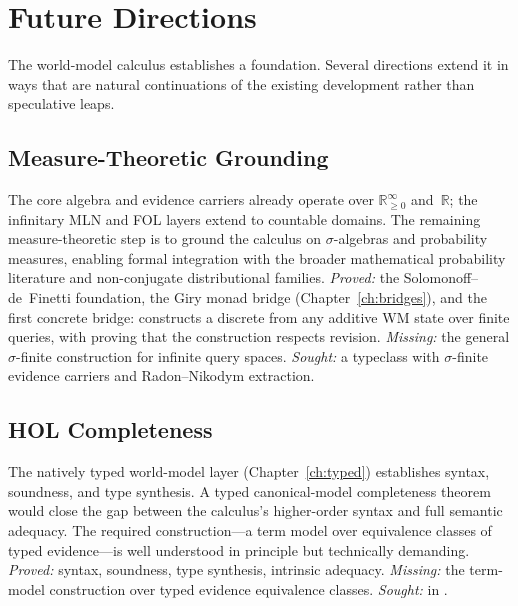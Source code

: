 \documentclass[11pt,openany]{report}
\begin{document}
\chapter{Future Directions}
\label{ch:future}

The world-model calculus establishes a foundation.  Several directions
extend it in ways that are natural continuations of the existing
development rather than speculative leaps.

\section{Measure-Theoretic Grounding}
\label{sec:future-measure}

The core algebra and evidence carriers already operate over
$\mathbb{R}_{\ge 0}^\infty$ and~$\mathbb{R}$; the infinitary
MLN and FOL layers extend to countable domains.
The remaining measure-theoretic step is to ground the calculus on
$\sigma$-algebras and probability measures, enabling formal
integration with the broader mathematical probability literature
and non-conjugate distributional families.
\emph{Proved:} the Solomonoff--de~Finetti foundation, the Giry
monad bridge (Chapter~\ref{ch:bridges}), and the first concrete
bridge:  constructs a discrete
 from any additive WM state over
finite queries, with  proving
that the construction respects revision.
\emph{Missing:} the general $\sigma$-finite construction for
infinite query spaces.
\emph{Sought:} a  typeclass with
$\sigma$-finite evidence carriers and Radon--Nikodym extraction.

\section{HOL Completeness}

The natively typed world-model layer
(Chapter~\ref{ch:typed}) establishes syntax, soundness, and type
synthesis.  A typed canonical-model completeness theorem would close
the gap between the calculus's higher-order syntax and full semantic
adequacy.  The required construction---a term model over equivalence
classes of typed evidence---is well understood in principle but
technically demanding.
\emph{Proved:} syntax, soundness, type synthesis, intrinsic adequacy.
\emph{Missing:} the term-model construction over typed evidence
equivalence classes.
\emph{Sought:}  in
.
\end{document}
